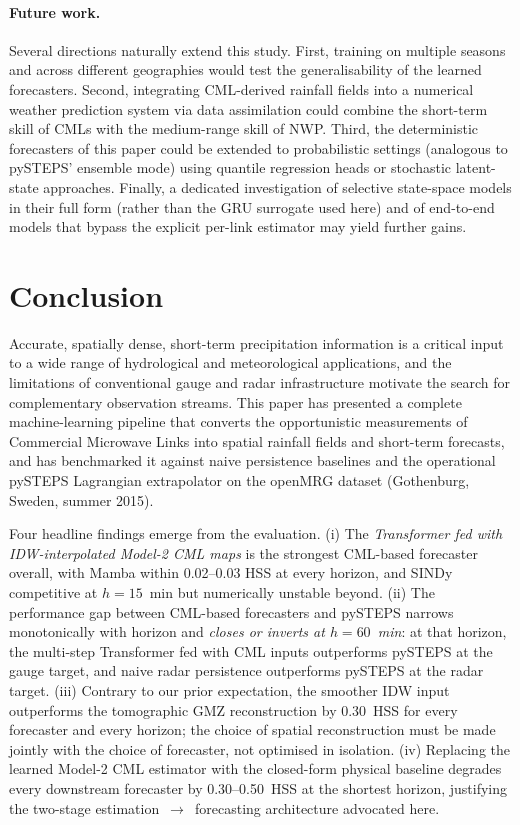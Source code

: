 \documentclass[12pt, a4paper]{article}
\begin{document}
\paragraph{Future work.} Several directions naturally extend this
study. First, training on multiple seasons and across different
geographies would test the generalisability of the learned forecasters.
Second, integrating CML-derived rainfall fields into a numerical
weather prediction system via data assimilation could combine the
short-term skill of CMLs with the medium-range skill of NWP. Third,
the deterministic forecasters of this paper could be extended to
probabilistic settings (analogous to pySTEPS' ensemble mode) using
quantile regression heads or stochastic latent-state approaches.
Finally, a dedicated investigation of selective state-space models in
their full form (rather than the GRU surrogate used here) and of
end-to-end models that bypass the explicit per-link estimator may
yield further gains.

\section{Conclusion}\label{sec:conclusion}

Accurate, spatially dense, short-term precipitation information is a
critical input to a wide range of hydrological and meteorological
applications, and the limitations of conventional gauge and radar
infrastructure motivate the search for complementary observation
streams. This paper has presented a complete machine-learning pipeline
that converts the opportunistic measurements of Commercial Microwave
Links into spatial rainfall fields and short-term forecasts, and has
benchmarked it against naive persistence baselines and the operational
pySTEPS Lagrangian extrapolator on the openMRG dataset (Gothenburg,
Sweden, summer 2015).

Four headline findings emerge from the evaluation. (i) The
\emph{Transformer fed with IDW-interpolated Model-2 CML maps} is the
strongest CML-based forecaster overall, with Mamba within 0.02--0.03
HSS at every horizon, and SINDy competitive at $h\!=\!15$~min but
numerically unstable beyond. (ii) The performance gap between
CML-based forecasters and pySTEPS narrows monotonically with horizon
and \emph{closes or inverts at $h\!=\!60$~min}: at that horizon, the
multi-step Transformer fed with CML inputs outperforms pySTEPS at the
gauge target, and naive radar persistence outperforms pySTEPS at the
radar target. (iii) Contrary to our prior expectation, the smoother
IDW input outperforms the tomographic GMZ reconstruction by 0.30~HSS
for every forecaster and every horizon; the choice of spatial
reconstruction must be made jointly with the choice of forecaster,
not optimised in isolation. (iv) Replacing the learned Model-2 CML
estimator with the closed-form physical baseline degrades every
downstream forecaster by 0.30--0.50~HSS at the shortest horizon,
justifying the two-stage estimation~$\to$~forecasting architecture
advocated here.
\end{document}
